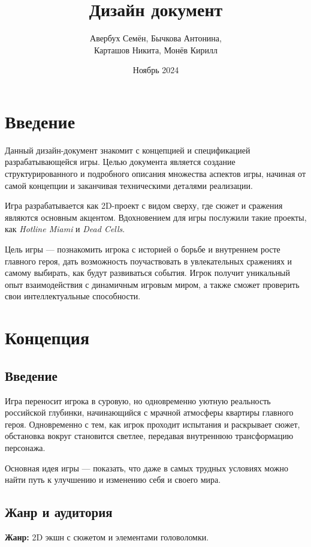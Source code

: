 \documentclass{article}
\title{Дизайн документ}
\author{Авербух Семён, Бычкова Антонина, \\ Карташов Никита, Монёв Кирилл}
\date{Ноябрь 2024}
\begin{document}
\maketitle

\tableofcontents

\section{Введение}
Данный дизайн-документ знакомит с концепцией и спецификацией разрабатывающейся игры. Целью документа является создание структурированного и подробного описания множества аспектов игры, начиная от самой концепции и заканчивая техническими деталями реализации.

Игра разрабатывается как 2D-проект с видом сверху, где сюжет и сражения являются основным акцентом. Вдохновением для игры послужили такие проекты, как \textit{Hotline Miami} и \textit{Dead Cells}.

Цель игры — познакомить игрока с историей о борьбе и внутреннем росте главного героя, дать возможность поучаствовать в увлекательных сражениях и самому выбирать, как будут развиваться события. Игрок получит уникальный опыт взаимодействия с динамичным игровым миром, а также сможет проверить свои интеллектуальные способности.

\section{Концепция}
    \subsection{Введение}
Игра переносит игрока в суровую, но одновременно уютную реальность российской глубинки, начинающийся с мрачной атмосферы квартиры главного героя. Одновременно с тем, как игрок проходит испытания и раскрывает сюжет, обстановка вокруг становится светлее, передавая внутреннюю трансформацию персонажа.

Основная идея игры — показать, что даже в самых трудных условиях можно найти путь к улучшению и изменению себя и своего мира.
    \subsection{Жанр и аудитория}
    \textbf{Жанр:} 2D экшн с сюжетом и элементами головоломки.
\end{document}
